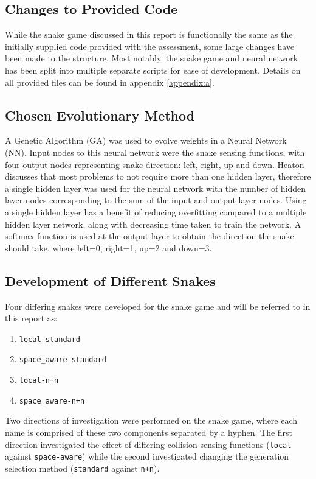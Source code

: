 \subsection{Changes to Provided Code}
While the snake game discussed in this report is functionally the same as the initially supplied code provided with the assessment, some large changes have been made to the structure. Most notably, the snake game and neural network has been split into multiple separate scripts for ease of development. Details on all provided files can be found in appendix \ref{appendix:a}.

\subsection{Chosen Evolutionary Method}
A Genetic Algorithm (GA) was used to evolve weights in a Neural Network (NN). Input nodes to this neural network were the snake sensing functions, with four output nodes representing snake direction: left, right, up and down. Heaton \cite{heaton} discusses that most problems to not require more than one hidden layer, therefore a single hidden layer was used for the neural network with the number of hidden layer nodes corresponding to the sum of the input and output layer nodes. Using a single hidden layer has a benefit of reducing overfitting compared to a multiple hidden layer network, along with decreasing time taken to train the network. A softmax function is used at the output layer to obtain the direction the snake should take, where left=0, right=1, up=2 and down=3. 

\subsection{Development of Different Snakes}
Four differing snakes were developed for the snake game and will be referred to in this report as:
\begin{enumerate}[itemsep=-0.5em]
  \item \verb|local-standard|
  \item \verb|space_aware-standard|
  \item \verb|local-n+n|
  \item \verb|space_aware-n+n|
\end{enumerate}
Two directions of investigation were performed on the snake game, where each name is comprised of these two components separated by a hyphen. The first direction investigated the effect of differing collision sensing functions (\verb|local| against \verb|space-aware|) while the second investigated changing the generation selection method (\verb|standard| against \verb|n+n|).

